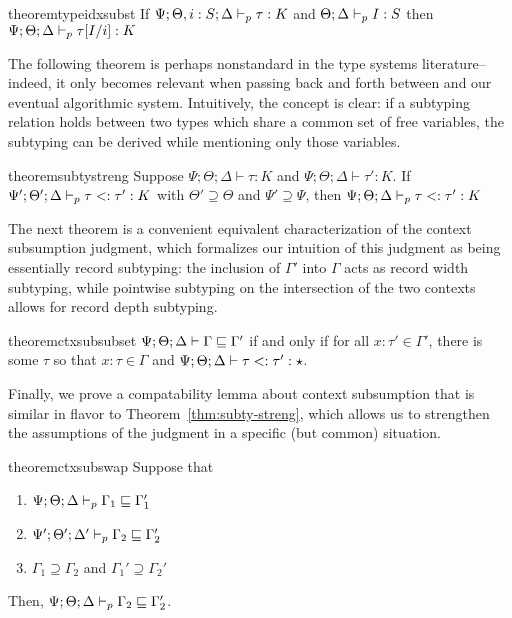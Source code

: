 \begin{restatable}{theorem}{typeidxsubst}
If $\Psi ; \Theta, i : S ; \Delta \vdash_p \tau : K$ and $\Theta ; \Delta \vdash_p I : S$ then $\Psi ; \Theta ; \Delta \vdash_p \tau[I/i] : K$
\label{thm:type-idx-subst}
\end{restatable}

The following theorem is perhaps nonstandard in the type systems literature-- indeed, it only becomes relevant when passing back and forth between \dlambdaamor and our eventual algorithmic system. Intuitively, the concept is clear: if a subtyping relation holds between two types which share a common set of free variables, the subtyping can be derived while mentioning only those variables.

\begin{restatable}{theorem}{subtystreng}
Suppose $\Psi ; \Theta ; \Delta \vdash \tau : K$ and $\Psi ; \Theta ; \Delta \vdash \tau' : K$.
If $\Psi' ; \Theta' ; \Delta \vdash_p \tau <: \tau' : K$ with $\Theta' \supseteq \Theta$ and $\Psi' \supseteq \Psi$, then $\Psi ; \Theta ; \Delta \vdash_p \tau <: \tau' : K$
\label{thm:subty-streng}
\end{restatable}

The next theorem is a convenient equivalent characterization of the context subsumption judgment, which formalizes our intuition of this judgment as being essentially record subtyping: the inclusion of $\Gamma'$ into $\Gamma$ acts as record width subtyping, while pointwise subtyping on the intersection of the two contexts allows for record depth subtyping.

\begin{restatable}{theorem}{ctxsubsubset}
$\Psi ; \Theta ; \Delta \vdash \Gamma \sqsubseteq \Gamma'$ if and only if for all $x : \tau' \in \Gamma'$, there is some $\tau$ so that $x : \tau \in \Gamma$ and $\Psi ; \Theta ; \Delta \vdash \tau <: \tau' : \star$.
\label{thm:ctx-sub-subset2}
\end{restatable}

Finally, we prove a compatability lemma about context subsumption that is similar in flavor to Theorem~\ref{thm:subty-streng}, which allows us to strengthen the assumptions of the judgment in a specific (but common) situation.

\begin{restatable}{theorem}{ctxsubswap}
Suppose that
\begin{enumerate}
  \item $\Psi ; \Theta ; \Delta \vdash_p \Gamma_1 \sqsubseteq \Gamma_1'$
  \item $\Psi' ; \Theta' ;  \Delta' \vdash_p \Gamma_2 \sqsubseteq \Gamma_2'$
  \item $\Gamma_1 \supseteq \Gamma_2$ and $\Gamma_1' \supseteq \Gamma_2'$
\end{enumerate}
Then, $\Psi ; \Theta ; \Delta \vdash_p \Gamma_2 \sqsubseteq \Gamma_2'$.
\label{thm:ctx-sub-swap}
\end{restatable}

